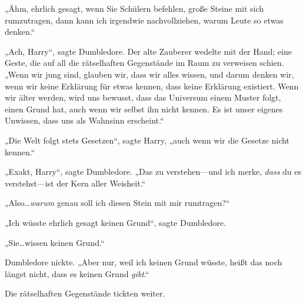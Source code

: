 „Ähm, ehrlich gesagt, wenn Sie Schülern befehlen, große Steine mit sich rumzutragen, dann kann ich irgendwie nachvollziehen, warum Leute so etwas denken.“

„Ach, Harry“, sagte Dumbledore. Der alte Zauberer wedelte mit der Hand; eine Geste, die auf all die rätselhaften Gegenstände im Raum zu verweisen schien. „Wenn wir jung sind, glauben wir, dass wir alles wissen, und darum denken wir, wenn wir keine Erklärung für etwas kennen, dass keine Erklärung existiert. Wenn wir älter werden, wird uns bewusst, dass das Universum einem Muster folgt, einen Grund hat, auch wenn wir selbst ihn nicht kennen. Es ist unser eigenes Unwissen, dass uns als Wahnsinn erscheint.“

„Die Welt folgt stets Gesetzen“, sagte Harry, „auch wenn wir die Gesetze nicht kennen.“

„Exakt, Harry“, sagte Dumbledore. „Das zu verstehen—und ich merke, \emph{dass} du es verstehst—ist der Kern aller Weisheit.“

„Also…\emph{warum} genau soll ich diesen Stein mit mir rumtragen?“

„Ich wüsste ehrlich gesagt keinen Grund“, sagte Dumbledore.

„Sie…wissen keinen Grund.“

Dumbledore nickte. „Aber nur, weil ich keinen Grund wüsste, heißt das noch längst nicht, dass es keinen Grund \emph{gibt}.“

Die rätselhaften Gegenstände tickten weiter.

